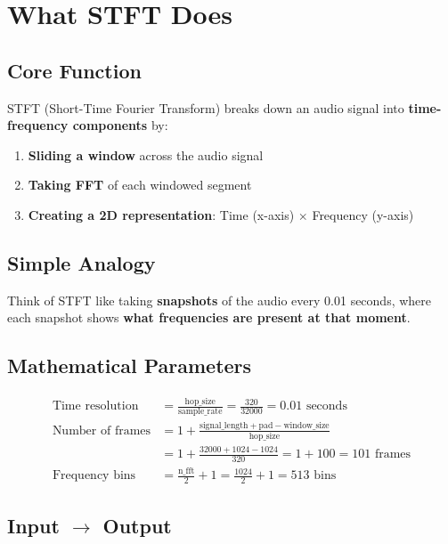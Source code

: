 \documentclass[12pt]{article}
\begin{document}
\section{What STFT Does}

\subsection{Core Function}
STFT (Short-Time Fourier Transform) breaks down an audio signal into \textbf{time-frequency components} by:

\begin{enumerate}
    \item \textbf{Sliding a window} across the audio signal
    \item \textbf{Taking FFT} of each windowed segment
    \item \textbf{Creating a 2D representation}: Time (x-axis) $\times$ Frequency (y-axis)
\end{enumerate}

\subsection{Simple Analogy}
Think of STFT like taking \textbf{snapshots} of the audio every 0.01 seconds, where each snapshot shows \textbf{what frequencies are present at that moment}.

\subsection{Mathematical Parameters}
\begin{align}
\text{Time resolution} &= \frac{\text{hop\_size}}{\text{sample\_rate}} = \frac{320}{32000} = 0.01 \text{ seconds} \\
\text{Number of frames} &= 1 + \frac{\text{signal\_length} + \text{pad} - \text{window\_size}}{\text{hop\_size}} \\
&= 1 + \frac{32000 + 1024 - 1024}{320} = 1 + 100 = 101 \text{ frames} \\
\text{Frequency bins} &= \frac{\text{n\_fft}}{2} + 1 = \frac{1024}{2} + 1 = 513 \text{ bins}
\end{align}

\subsection{Input $\rightarrow$ Output}
\begin{center}
\end{center}
\end{document}

